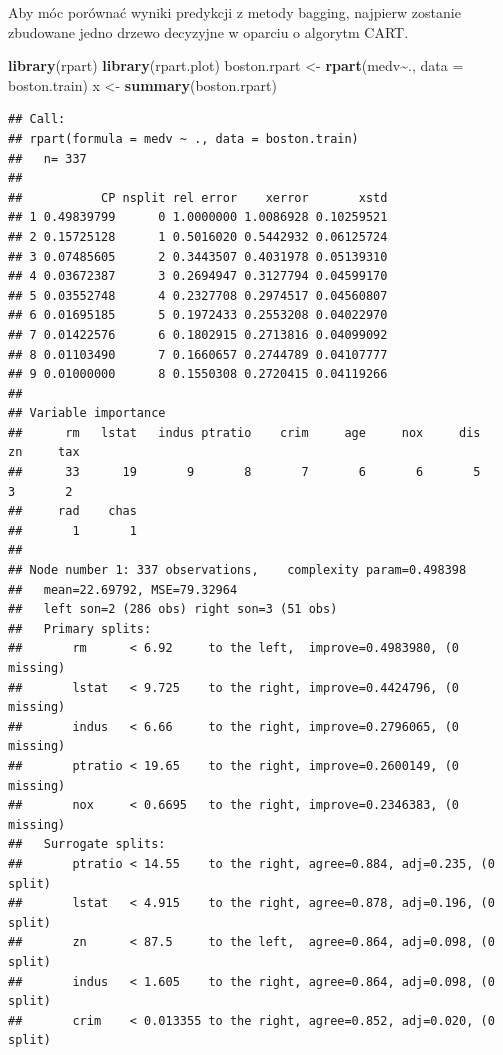 \documentclass[
]{book}
\newenvironment{Shaded}{\begin{snugshade}}{\end{snugshade}}
\newcommand{\AttributeTok}[1]{\textcolor[rgb]{0.13,0.29,0.53}{#1}}
\newcommand{\FunctionTok}[1]{\textcolor[rgb]{0.13,0.29,0.53}{\textbf{#1}}}
\newcommand{\NormalTok}[1]{#1}
\newcommand{\OtherTok}[1]{\textcolor[rgb]{0.56,0.35,0.01}{#1}}
\newcommand{\SpecialCharTok}[1]{\textcolor[rgb]{0.81,0.36,0.00}{\textbf{#1}}}
\theoremstyle{plain}
\theoremstyle{definition}
\theoremstyle{definition}
\theoremstyle{definition}
\theoremstyle{definition}
\theoremstyle{definition}
\theoremstyle{remark}
\begin{document}
Aby móc porównać wyniki predykcji z metody bagging, najpierw zostanie zbudowane jedno drzewo decyzyjne w oparciu o algorytm CART.

\begin{Shaded}
\begin{Highlighting}[]
\FunctionTok{library}\NormalTok{(rpart)}
\FunctionTok{library}\NormalTok{(rpart.plot)}
\NormalTok{boston.rpart }\OtherTok{\textless{}{-}} \FunctionTok{rpart}\NormalTok{(medv}\SpecialCharTok{\textasciitilde{}}\NormalTok{., }\AttributeTok{data =}\NormalTok{ boston.train)}
\NormalTok{x }\OtherTok{\textless{}{-}} \FunctionTok{summary}\NormalTok{(boston.rpart)}
\end{Highlighting}
\end{Shaded}

\begin{verbatim}
## Call:
## rpart(formula = medv ~ ., data = boston.train)
##   n= 337 
## 
##           CP nsplit rel error    xerror       xstd
## 1 0.49839799      0 1.0000000 1.0086928 0.10259521
## 2 0.15725128      1 0.5016020 0.5442932 0.06125724
## 3 0.07485605      2 0.3443507 0.4031978 0.05139310
## 4 0.03672387      3 0.2694947 0.3127794 0.04599170
## 5 0.03552748      4 0.2327708 0.2974517 0.04560807
## 6 0.01695185      5 0.1972433 0.2553208 0.04022970
## 7 0.01422576      6 0.1802915 0.2713816 0.04099092
## 8 0.01103490      7 0.1660657 0.2744789 0.04107777
## 9 0.01000000      8 0.1550308 0.2720415 0.04119266
## 
## Variable importance
##      rm   lstat   indus ptratio    crim     age     nox     dis      zn     tax 
##      33      19       9       8       7       6       6       5       3       2 
##     rad    chas 
##       1       1 
## 
## Node number 1: 337 observations,    complexity param=0.498398
##   mean=22.69792, MSE=79.32964 
##   left son=2 (286 obs) right son=3 (51 obs)
##   Primary splits:
##       rm      < 6.92     to the left,  improve=0.4983980, (0 missing)
##       lstat   < 9.725    to the right, improve=0.4424796, (0 missing)
##       indus   < 6.66     to the right, improve=0.2796065, (0 missing)
##       ptratio < 19.65    to the right, improve=0.2600149, (0 missing)
##       nox     < 0.6695   to the right, improve=0.2346383, (0 missing)
##   Surrogate splits:
##       ptratio < 14.55    to the right, agree=0.884, adj=0.235, (0 split)
##       lstat   < 4.915    to the right, agree=0.878, adj=0.196, (0 split)
##       zn      < 87.5     to the left,  agree=0.864, adj=0.098, (0 split)
##       indus   < 1.605    to the right, agree=0.864, adj=0.098, (0 split)
##       crim    < 0.013355 to the right, agree=0.852, adj=0.020, (0 split)

\end{verbatim}
\end{document}
